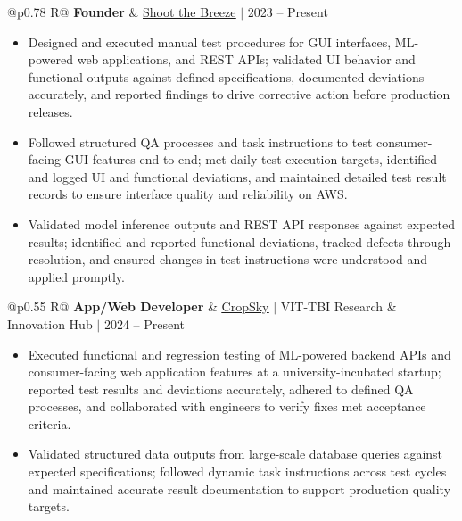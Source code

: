 \documentclass[a4paper,10pt]{article}
\newcommand{\ulink}[2]{\href{#1}{\uline{#2}}}
\newcommand{\subheading}[1]{{\color[HTML]{0A0A0A}\fontsize{12}{14}\selectfont\bfseries #1}}
\newcommand{\meta}[1]{{\color[HTML]{5C5C5C}\fontsize{10.5}{12.5}\selectfont #1}}
\begin{document}
\begin{tabularx}{\linewidth}{@{}p{0.78\linewidth} R@{}}
\subheading{Founder} & \meta{\ulink{https://shoot-the-breeze.vercel.app}{Shoot the Breeze} $|$ 2023 -- Present}
\end{tabularx}
\begin{itemize}[nosep, leftmargin=1.5em, itemsep=1pt, topsep=2pt]
\item {\color[HTML]{0A0A0A}\fontsize{11}{14}\selectfont
Designed and executed manual test procedures for GUI interfaces, ML-powered web applications, and REST APIs; validated UI behavior and functional outputs against defined specifications, documented deviations accurately, and reported findings to drive corrective action before production releases.}
\item {\color[HTML]{0A0A0A}\fontsize{11}{14}\selectfont
Followed structured QA processes and task instructions to test consumer-facing GUI features end-to-end; met daily test execution targets, identified and logged UI and functional deviations, and maintained detailed test result records to ensure interface quality and reliability on AWS.}
\item {\color[HTML]{0A0A0A}\fontsize{11}{14}\selectfont
Validated model inference outputs and REST API responses against expected results; identified and reported functional deviations, tracked defects through resolution, and ensured changes in test instructions were understood and applied promptly.}
\end{itemize}

\vspace{2pt}

\begin{tabularx}{\linewidth}{@{}p{0.55\linewidth} R@{}}
\subheading{App/Web Developer} & \meta{\ulink{https://sites.google.com/view/cropsky/home}{CropSky} $|$ VIT-TBI Research \& Innovation Hub $|$ 2024 -- Present}
\end{tabularx}
\begin{itemize}[nosep, leftmargin=1.5em, itemsep=1pt, topsep=2pt]
\item {\color[HTML]{0A0A0A}\fontsize{11}{14}\selectfont
Executed functional and regression testing of ML-powered backend APIs and consumer-facing web application features at a university-incubated startup; reported test results and deviations accurately, adhered to defined QA processes, and collaborated with engineers to verify fixes met acceptance criteria.}
\item {\color[HTML]{0A0A0A}\fontsize{11}{14}\selectfont
Validated structured data outputs from large-scale database queries against expected specifications; followed dynamic task instructions across test cycles and maintained accurate result documentation to support production quality targets.}
\end{itemize}
\end{document}

